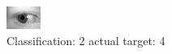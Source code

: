 \begin{figure}[h!]
\begin{center}
\includegraphics[width=0.60\columnwidth]{figures/ID713_class_2_target_4.png}
\end{center}
\caption{ Classification: 2 actual target: 4}
\label{fig:ID713_class_2_target_4}
\end{figure}
